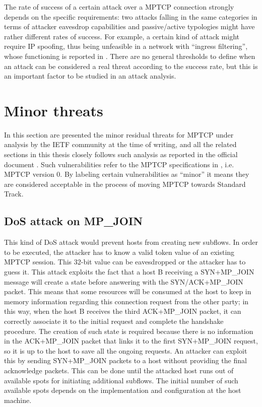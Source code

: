 The rate of success of a certain attack over a MPTCP connection strongly depends on the specific requirements: two attacks falling in the same categories in terms of attacker eavesdrop capabilities and passive/active typologies might have rather different rates of success. For example, a certain kind of attack might require IP spoofing, thus being unfeasible in a network with ``ingress filtering'', whose functioning is reported in .
There are no general thresholds to define when an attack can be considered a real threat according to the success rate, but this is an important factor to be studied in an attack analysis.

\section{Minor threats}
In this section are presented the minor residual threats for MPTCP under analysis by the IETF community at the time of writing, and all the related sections in this thesis closely follows such analysis as reported in the official document . Such vulnerabilities refer to the MPTCP specifications in , i.e. MPTCP version 0. By labeling certain vulnerabilities as ``minor'' it means they are considered acceptable in the process of moving MPTCP towards Standard Track. 

\subsection{DoS attack on MP\_JOIN}
This kind of DoS attack would prevent hosts from creating new subflows. In order to be executed, the attacker has to know a valid token value of an existing MPTCP session. This 32-bit value can be eavesdropped or the attacker has to guess it.
This attack exploits the fact that a host B receiving a SYN+MP\_JOIN message will create a state before answering with the SYN/ACK+MP\_JOIN packet. This means that some resources will be consumed at the host to keep in memory information regarding this connection request from the other party; in this way, when the host B receives the third ACK+MP\_JOIN packet, it can correctly associate it to the initial request and complete the handshake procedure. The creation of such state is required because there is no information in the ACK+MP\_JOIN packet that links it to the first SYN+MP\_JOIN request, so it is up to the host to save all the ongoing requests.
An attacker can exploit this by sending SYN+MP\_JOIN packets to a host without providing the final acknowledge packets. This can be done until the attacked host runs out of available spots for initiating additional subflows. The initial number of such available spots depends on the implementation and configuration at the host machine. 

